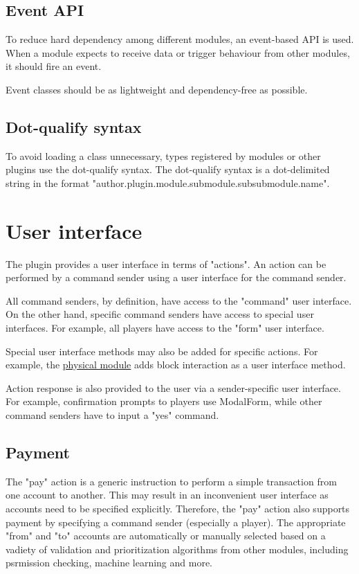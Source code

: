 \documentclass{report}
\begin{document}
			\section{Event API}

				To reduce hard dependency among different modules, an event-based API is used.
				When a module expects to receive data or trigger behaviour from other modules,
				it should fire an event.

				Event classes should be as lightweight and dependency-free as possible.

			\section{Dot-qualify syntax}
				To avoid loading a class unnecessary, types registered by modules or other plugins use the dot-qualify syntax.
				The dot-qualify syntax is a dot-delimited string in the format "author.plugin.module.submodule.subsubmodule.name".

		\chapter{User interface}

			The plugin provides a user interface in terms of "actions".
			An action can be performed by a command sender using a user interface for the command sender.

			All command senders, by definition, have access to the "command" user interface.
			On the other hand, specific command senders have access to special user interfaces.
			For example, all players have access to the "form" user interface.

			Special user interface methods may also be added for specific actions.
			For example, the \href{sec:physical-module}{physical module} adds block interaction as a user interface method.

			Action response is also provided to the user via a sender-specific user interface.
			For example, confirmation prompts to players use ModalForm,
			while other command senders have to input a "yes" command.

			\section{Payment}

				The "pay" action is a generic instruction to perform a simple transaction from one account to another.
				This may result in an inconvenient user interface as accounts need to be specified explicitly.
				Therefore, the "pay" action also supports payment by specifying a command sender (especially a player).
				The appropriate "from" and "to" accounts are automatically or manually selected
				based on a vadiety of validation and prioritization algorithms from other modules,
				including psrmission checking, machine learning and more.
\end{document}
